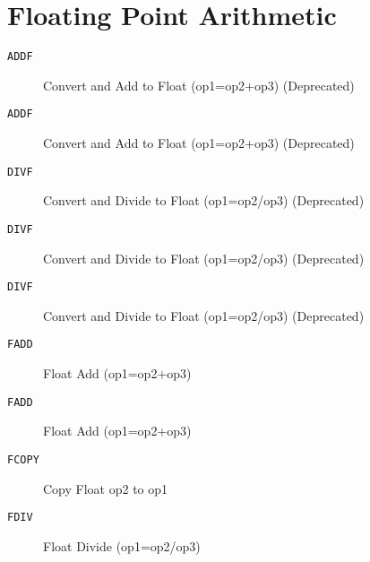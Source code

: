 \section{Floating Point Arithmetic}
\begin{description}
\item[\texttt{ADDF       }]  Convert and Add to Float (op1=op2+op3) (Deprecated)\\
\end{description}

\begin{description}
\item[\texttt{ADDF       }]  Convert and Add to Float (op1=op2+op3) (Deprecated)\\
\end{description}

\begin{description}
\item[\texttt{DIVF       }]  Convert and Divide to Float (op1=op2/op3) (Deprecated)\\
\end{description}

\begin{description}
\item[\texttt{DIVF       }]  Convert and Divide to Float (op1=op2/op3) (Deprecated)\\
\end{description}

\begin{description}
\item[\texttt{DIVF       }]  Convert and Divide to Float (op1=op2/op3) (Deprecated)\\
\end{description}

\begin{description}
\item[\texttt{FADD       }]  Float Add (op1=op2+op3)\\
\end{description}

\begin{description}
\item[\texttt{FADD       }]  Float Add (op1=op2+op3)\\
\end{description}

\begin{description}
\item[\texttt{FCOPY      }]  Copy Float op2 to op1\\
\end{description}

\begin{description}
\item[\texttt{FDIV       }]  Float Divide (op1=op2/op3)\\
\end{description}
